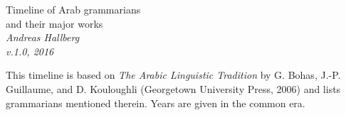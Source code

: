 \documentclass[a4paper,landscape]{article}
\begin{document}
\thispagestyle{empty}

\begin{minipage}[t]{.4\textwidth}
{\LARGE Timeline of Arab grammarians\\and their major works}\\[\medskipamount]
\textit{Andreas Hallberg\\
v.1.0, 2016}
\end{minipage}
\hfill
\begin{minipage}[t]{.4\textwidth}
This timeline is based on \textit{The Arabic Linguistic Tradition} by G. Bohas, \mbox{J.-P.} Guillaume, and D. Kouloughli (Georgetown University Press, 2006) and lists grammarians mentioned therein. Years are given in the common era.
\end{minipage}


\vfill
\end{document}
